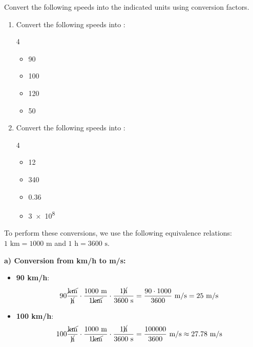 \begin{exercise}
    Convert the following speeds into the indicated units using conversion factors.
    \begin{enumerate}[label=\letraminuscula]
        \item Convert the following speeds into \unit{\mps}:
        \begin{multicols}{4}
            \begin{itemize}
                \item \qty{90}{\kmph}
                \item \qty{100}{\kmph}
                \item \qty{120}{\kmph}
                \item \qty{50}{\kmph}
            \end{itemize}
        \end{multicols}
        \item Convert the following speeds into \unit{\kmph}:
        \begin{multicols}{4}
            \begin{itemize}
                \item \qty{12}{\mps}
                \item \qty{340}{\mps}
                \item \qty{0.36}{\mps}
                \item \qty{3e8}{\mps}
            \end{itemize}
        \end{multicols}
    \end{enumerate}
    \begin{solu}

        To perform these conversions, we use the following equivalence relations: $1 \text{ km} = 1000 \text{ m}$ and $1 \text{ h} = 3600 \text{ s}$.

        \textbf{a) Conversion from km/h to m/s:}
        \begin{itemize}
            \item \textbf{90 km/h}:
            \[ 90 \frac{\cancel{\text{km}}}{\cancel{\text{h}}} \cdot \frac{1000 \text{ m}}{1 \cancel{\text{km}}} \cdot \frac{1 \cancel{\text{h}}}{3600 \text{ s}} = \frac{90 \cdot 1000}{3600} \text{ m/s} = 25 \text{ m/s} \]

            \item \textbf{100 km/h}:
            \[ 100 \frac{\cancel{\text{km}}}{\cancel{\text{h}}} \cdot \frac{1000 \text{ m}}{1 \cancel{\text{km}}} \cdot \frac{1 \cancel{\text{h}}}{3600 \text{ s}} = \frac{100000}{3600} \text{ m/s} \approx 27.78 \text{ m/s} \]


\end{itemize}
\end{solu}
\end{exercise}
